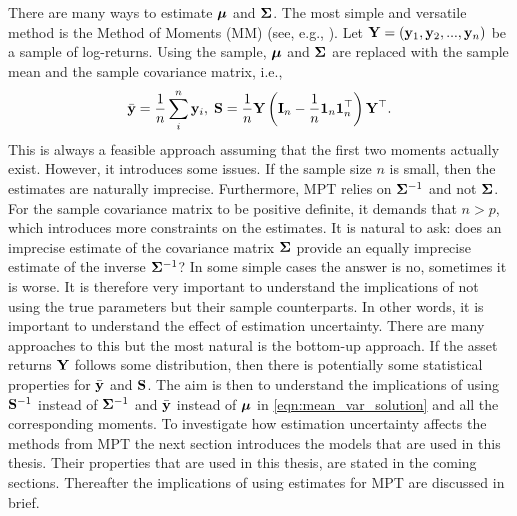 \documentclass[12pt, twoside]{book}\usepackage{knitr}
\begin{document}
There are many ways to estimate $\mbox{\boldmath$\mu$}$ and $\mathbf{\Sigma}$.
The most simple and versatile method is the Method of Moments (MM) (see, e.g., \cite[ch. 9]{wasserman2004all}). 
Let $\mathbf{Y} = (\mathbf{y}_1, \mathbf{y}_2, ..., \mathbf{y}_n)$ be a sample of log-returns.
Using the sample, $\mbox{\boldmath$\mu$}$ and $\mathbf{\Sigma}$ are replaced with the sample mean and the sample covariance matrix, i.e.,
$$
\bar{\mathbf{y}} = \frac{1}{n} \sum_i^n \mathbf{y}_i, \; \mathbf{S} = \frac{1}{n}\mathbf{Y} \left(\mathbf{I}_n - \frac{1}{n} \mathbf{1}_n \mathbf{1}_n^\top \right) \mathbf{Y}^\top.
$$
This is always a feasible approach assuming that the first two moments actually exist. 
However, it introduces some issues.
If the sample size $n$ is small, then the estimates are naturally imprecise.
Furthermore, MPT relies on $\mathbf{\Sigma}^{-1}$ and not $\mathbf{\Sigma}$.
For the sample covariance matrix to be positive definite, it demands that $n>p$, which introduces more constraints on the estimates.
It is natural to ask: does an imprecise estimate of the covariance matrix $\mathbf{\Sigma}$ provide an equally imprecise estimate of the inverse $\mathbf{\Sigma}^{-1}$?
In some simple cases the answer is no, sometimes it is worse. 
It is therefore very important to understand the implications of not using the true parameters but their sample counterparts.
In other words, it is important to understand the effect of estimation uncertainty.
There are many approaches to this but the most natural is the bottom-up approach. 
If the asset returns $\mathbf{Y}$ follows some distribution, then there is potentially some statistical properties for $\bar{\mathbf{y}}$ and $\mathbf{S}$.
The aim is then to understand the implications of using $\mathbf{S}^{-1}$ instead of $\mathbf{\Sigma}^{-1}$ and $\bar{\mathbf{y}}$ instead of $\mbox{\boldmath$\mu$}$ in \eqref{eqn:mean_var_solution} and all the corresponding moments.
To investigate how estimation uncertainty affects the methods from MPT the next section introduces the models that are used in this thesis.
Their properties that are used in this thesis, are stated in the coming sections.
Thereafter the implications of using estimates for MPT are discussed in brief.
\end{document}
